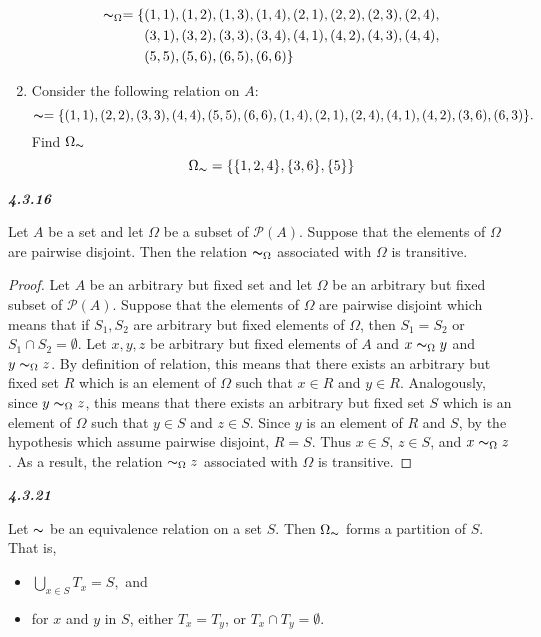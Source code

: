 \documentclass{article}
\let\euscr\mathscr
\begin{document}
\begin{flushleft}
\begin{flushleft}
\begin{enumerate}
				\begin{align*}
					\thicksim_\Omega = \{&(1,1), (1,2), (1,3), (1,4), (2,1), (2,2), (2,3), (2,4), \\
					& (3,1), (3,2), (3,3), (3,4), (4,1), (4,2), (4,3), (4,4), \\
					& (5,5), (5,6), (6,5), (6,6) \}
				\end{align*}
				
			\item Consider the following relation on $A$:
			\[\thicksim = \{(1,1), (2,2), (3,3), (4,4), (5,5), (6,6), (1,4), (2,1), (2,4), (4, 1), (4,2), (3,6), (6,3) \}.\]
			Find $\Omega_\thicksim$
			\[\Omega_\thicksim = \{\{1, 2, 4\}, \{3,6\}, \{5\}\}\]
			\end{enumerate}
		\end{flushleft}
		
		\textbf{\textit{4.3.16}}
		\begin{flushleft}
			Let $A$ be a set and let $\Omega$ be a subset of $\euscr{P}(A)$. Suppose that the elements of $\Omega$ are pairwise disjoint. Then the relation $\thicksim_\Omega$ associated with $\Omega$ is transitive.
			
			\begin{proof}
				Let $A$ be an arbitrary but fixed set and let $\Omega$ be an arbitrary but fixed subset of $\euscr{P}(A)$. Suppose that the elements of $\Omega$ are pairwise disjoint which means that if $S_1, S_2$ are arbitrary but fixed elements of $\Omega$, then $S_1 = S_2$ or $S_1 \cap S_2 = \emptyset$. Let $x,y,z$ be arbitrary but fixed elements of $A$ and $x \thicksim_\Omega y$ and $y \thicksim_\Omega z$. By definition of relation, this means that there exists an arbitrary but fixed set $R$ which is an element of $\Omega$ such that $x \in R$ and $y \in R$. Analogously, since $y \thicksim_\Omega z$, this means that there exists an arbitrary but fixed set $S$ which is an element of $\Omega$ such that $y \in S$ and $z \in S$. Since $y$ is an element of $R$ and $S$, by the hypothesis which assume pairwise disjoint, $R = S$. Thus $x \in S$, $z \in S$, and $x \thicksim_\Omega z$. As a result, the relation $\thicksim_\Omega z$ associated with $\Omega$ is transitive.
			\end{proof}
		\end{flushleft}
		
		\textbf{\textit{4.3.21}}
		\begin{flushleft}
			Let $\thicksim$ be an equivalence relation on a set $S$. Then $\Omega_\thicksim$ forms a partition of $S$. That is, \\
			\begin{itemize}
				\item $\bigcup\limits_{x \in S} T_x = S,$ and
				\item for $x$ and $y$ in $S$, either $T_x = T_y$, or $T_x \cap T_y = \emptyset$.
			\end{itemize}
			

\end{flushleft}
\end{flushleft}
\end{document}
